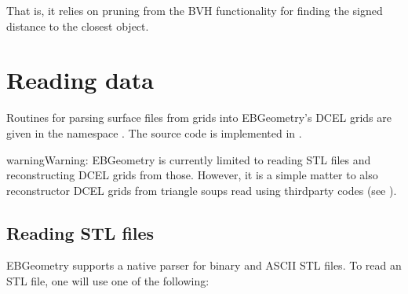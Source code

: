 \documentclass[letterpaper,10pt,english]{sphinxmanual}
\begin{document}
\sphinxAtStartPar
That is, it relies on pruning from the BVH functionality for finding the signed distance to the closest object.

\sphinxstepscope


\section{Reading data}
\label{\detokenize{Parsers:reading-data}}\label{\detokenize{Parsers:chap-parsers}}\label{\detokenize{Parsers::doc}}
\sphinxAtStartPar
Routines for parsing surface files from grids into EBGeometry’s DCEL grids are given in the namespace .
The source code is implemented in .

\begin{sphinxadmonition}{warning}{Warning:}
\sphinxAtStartPar
EBGeometry is currently limited to reading STL files and reconstructing DCEL grids from those.
However, it is a simple matter to also reconstructor DCEL grids from triangle soups read using third\sphinxhyphen{}party codes (see {\hyperref[\detokenize{Parsers:chap-thirdpartyparser}]{}}).
\end{sphinxadmonition}


\subsection{Reading STL files}
\label{\detokenize{Parsers:reading-stl-files}}
\sphinxAtStartPar
EBGeometry supports a native parser for binary and ASCII STL files.
To read an STL file, one will use one of the following:

\begin{sphinxVerbatim}[commandchars=\\\{\}]
  
  
   

  
   
   
\end{sphinxVerbatim}
\end{document}
